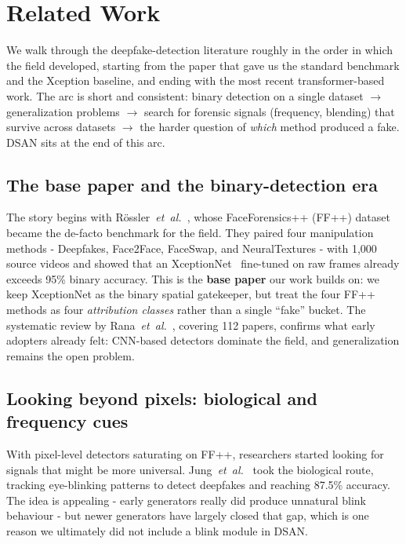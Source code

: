 \section{Related Work}

We walk through the deepfake-detection literature roughly in the order in which the field developed, starting from the paper that gave us the standard benchmark and the Xception baseline, and ending with the most recent transformer-based work. The arc is short and consistent: binary detection on a single dataset $\rightarrow$ generalization problems $\rightarrow$ search for forensic signals (frequency, blending) that survive across datasets $\rightarrow$ the harder question of \textit{which} method produced a fake. DSAN sits at the end of this arc.

\subsection{The base paper and the binary-detection era}
The story begins with R\"ossler~\textit{et~al.}~\cite{rossler2019faceforensics}, whose FaceForensics++ (FF++) dataset became the de-facto benchmark for the field. They paired four manipulation methods - Deepfakes, Face2Face, FaceSwap, and NeuralTextures - with 1,000 source videos and showed that an XceptionNet~\cite{chollet2017xception} fine-tuned on raw frames already exceeds 95\% binary accuracy. This is the \textbf{base paper} our work builds on: we keep XceptionNet as the binary spatial gatekeeper, but treat the four FF++ methods as four \textit{attribution classes} rather than a single ``fake'' bucket. The systematic review by Rana~\textit{et~al.}~\cite{rana2022slr}, covering 112 papers, confirms what early adopters already felt: CNN-based detectors dominate the field, and generalization remains the open problem.

\subsection{Looking beyond pixels: biological and frequency cues}
With pixel-level detectors saturating on FF++, researchers started looking for signals that might be more universal. Jung~\textit{et~al.}~\cite{jung2020deepvision} took the biological route, tracking eye-blinking patterns to detect deepfakes and reaching 87.5\% accuracy. The idea is appealing - early generators really did produce unnatural blink behaviour - but newer generators have largely closed that gap, which is one reason we ultimately did not include a blink module in DSAN.

